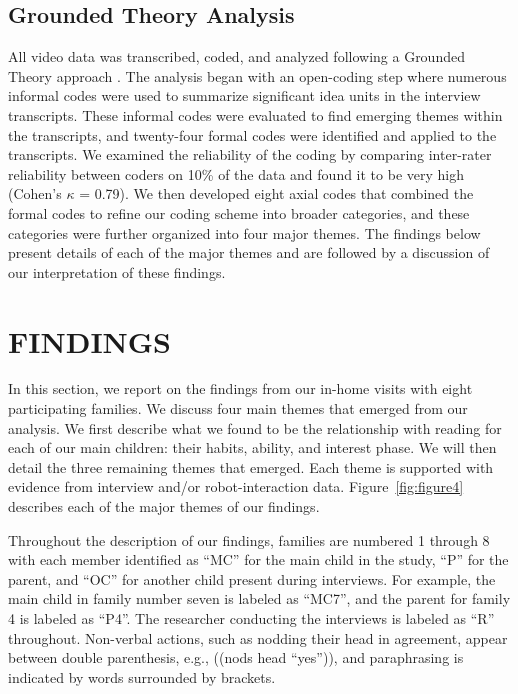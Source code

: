 \documentclass{sigchi}
\begin{document}
\subsection{Grounded Theory Analysis}
{\color{Purple}All video data was transcribed, coded, and analyzed following a Grounded Theory approach \cite{Glaser:1967,Charmaz:2012}. The analysis began with an open-coding step where numerous informal codes were used to summarize significant idea units in the interview transcripts. These informal codes were evaluated to find emerging themes within the transcripts, and twenty-four formal codes were identified and applied to the transcripts. We examined the reliability of the coding by comparing inter-rater reliability between coders on 10\% of the data and found it to be very high (Cohen's $\kappa$ = 0.79). We then developed eight axial codes that combined the formal codes to refine our coding scheme into broader categories, and these categories were further organized into four major themes.} The findings below present details of each of the major themes and are followed by a discussion of our interpretation of these findings.
 
\section{FINDINGS}
In this section, we report on the findings from our in-home visits with eight participating families. We discuss four main themes that emerged from our analysis. We first describe what we found to be the relationship with reading for each of our main children: their habits, ability, and interest phase. We will then detail the three remaining themes that emerged. Each theme is supported with evidence from interview and/or robot-interaction data. Figure~\ref{fig:figure4} describes each of the major themes of our findings. 

Throughout the description of our findings, families are numbered 1 through 8 with each member identified as ``MC'' for the main child in the study, ``P'' for the parent, and ``OC'' for another child present during interviews. For example, the main child in family number seven is labeled as ``MC7'', and the parent for family 4 is labeled as ``P4''. The researcher conducting the interviews is labeled as ``R'' throughout. Non-verbal actions, such as nodding their head in agreement, appear between double parenthesis, e.g., ((nods head ``yes'')), and paraphrasing is indicated by words surrounded by brackets.
\end{document}
